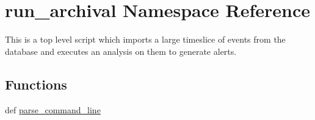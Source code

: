 \hypertarget{namespacerun__archival}{\section{run\-\_\-archival Namespace Reference}
\label{namespacerun__archival}
}


\begin{DoxyVerb} This is a top level script which imports
 a large timeslice of events from the database and
 executes an analysis on them to generate alerts.\end{DoxyVerb}
  


\subsection*{Functions}
\begin{DoxyCompactItemize}
\item 
def \hyperlink{namespacerun__archival_a020b34744fef770ee7c2d058e26329e1}{parse\-\_\-command\-\_\-line}
\end{DoxyCompactItemize}
